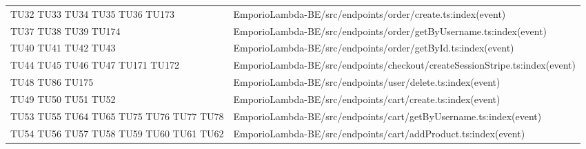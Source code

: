{\begin{longtable}{C{2cm} C{12.8cm}}
TU32 \newline TU33 \newline TU34 \newline TU35 \newline TU36 \newline TU173 & EmporioLambda-BE/src/endpoints/order/create.ts:index(event)\\

TU37 \newline TU38 \newline TU39 \newline TU174 & EmporioLambda-BE/src/endpoints/order/getByUsername.ts:index(event)\\

TU40 \newline TU41 \newline TU42 \newline TU43 & EmporioLambda-BE/src/endpoints/order/getById.ts:index(event)\\

TU44 \newline TU45 \newline TU46 \newline TU47 \newline TU171 \newline TU172 & EmporioLambda-BE/src/endpoints/checkout/createSessionStripe.ts:index(event)\\

TU48 \newline TU86 \newline TU175 & EmporioLambda-BE/src/endpoints/user/delete.ts:index(event)\\

TU49 \newline TU50 \newline TU51 \newline TU52 & EmporioLambda-BE/src/endpoints/cart/create.ts:index(event)\\

TU53 \newline TU55 \newline TU64 \newline TU65 \newline TU75 \newline TU76 \newline TU77 \newline TU78 & EmporioLambda-BE/src/endpoints/cart/getByUsername.ts:index(event)\\

TU54 \newline TU56 \newline TU57 \newline TU58 \newline TU59 \newline TU60 \newline TU61 \newline TU62 & EmporioLambda-BE/src/endpoints/cart/addProduct.ts:index(event)\\


\end{longtable}}

